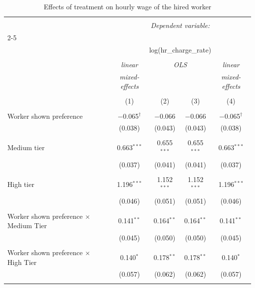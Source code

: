 
\begin{table}[!htbp] \centering 
  \caption{Effects of treatment on hourly wage of the hired worker} 
  \label{tab:wage_hired} 
\begin{tabular}{@{\extracolsep{5pt}}lcccc} 
\\[-1.8ex]\hline 
\hline \\[-1.8ex] 
 & \multicolumn{4}{c}{\textit{Dependent variable:}} \\ 
\cline{2-5} 
\\[-1.8ex] & \multicolumn{4}{c}{log(hr\_charge\_rate)} \\ 
\\[-1.8ex] & \textit{linear} & \multicolumn{2}{c}{\textit{OLS}} & \textit{linear} \\ 
 & \textit{mixed-effects} & \multicolumn{2}{c}{\textit{}} & \textit{mixed-effects} \\ 
\\[-1.8ex] & (1) & (2) & (3) & (4)\\ 
\hline \\[-1.8ex] 
 Worker shown preference & $-$0.065$^{\dagger}$ & $-$0.066 & $-$0.066 & $-$0.065$^{\dagger}$ \\ 
  & (0.038) & (0.043) & (0.043) & (0.038) \\ 
  & & & & \\ 
 Medium tier & 0.663$^{***}$ & 0.655$^{***}$ & 0.655$^{***}$ & 0.663$^{***}$ \\ 
  & (0.037) & (0.041) & (0.041) & (0.037) \\ 
  & & & & \\ 
 High tier & 1.196$^{***}$ & 1.152$^{***}$ & 1.152$^{***}$ & 1.196$^{***}$ \\ 
  & (0.046) & (0.051) & (0.051) & (0.046) \\ 
  & & & & \\ 
 Worker shown preference $\times$ Medium Tier & 0.141$^{**}$ & 0.164$^{**}$ & 0.164$^{**}$ & 0.141$^{**}$ \\ 
  & (0.045) & (0.050) & (0.050) & (0.045) \\ 
  & & & & \\ 
 Worker shown preference $\times$ High Tier & 0.140$^{*}$ & 0.178$^{**}$ & 0.178$^{**}$ & 0.140$^{*}$ \\ 
  & (0.057) & (0.062) & (0.062) & (0.057) \\ 
  & & & & \\ 

\end{tabular}
\end{table}
